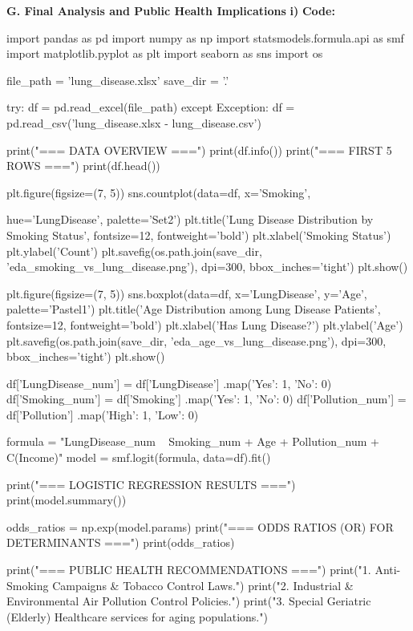 \documentclass[12pt,a4paper]{article}
\begin{document}
\textbf{G. Final Analysis and Public Health Implications}
\textbf{i)}
\textbf{Code:}
\begin{codebox}
import pandas as pd
import numpy as np
import statsmodels.formula.api as smf
import matplotlib.pyplot as plt
import seaborn as sns
import os

file_path = 'lung_disease.xlsx'
save_dir = '.'

try:
    df = pd.read_excel(file_path)
except Exception:
    df = pd.read_csv('lung_disease.xlsx - lung_disease.csv')

print("=== DATA OVERVIEW ===")
print(df.info())
print("\n=== FIRST 5 ROWS ===")
print(df.head())

plt.figure(figsize=(7, 5))
sns.countplot(data=df, x='Smoking', 

hue='LungDisease', palette='Set2')
plt.title('Lung Disease Distribution by
Smoking Status', fontsize=12, fontweight='bold')
plt.xlabel('Smoking Status')
plt.ylabel('Count')
plt.savefig(os.path.join(save_dir, 
'eda_smoking_vs_lung_disease.png'), dpi=300, bbox_inches='tight')
plt.show()

plt.figure(figsize=(7, 5))
sns.boxplot(data=df, x='LungDisease',
y='Age', palette='Pastel1')
plt.title('Age Distribution among Lung Disease Patients',
fontsize=12, fontweight='bold')
plt.xlabel('Has Lung Disease?')
plt.ylabel('Age')
plt.savefig(os.path.join(save_dir,
'eda_age_vs_lung_disease.png'),
dpi=300, bbox_inches='tight')
plt.show()

df['LungDisease_num'] = df['LungDisease']
.map({'Yes': 1, 'No': 0})
df['Smoking_num'] = df['Smoking']
.map({'Yes': 1, 'No': 0})
df['Pollution_num'] = df['Pollution']
.map({'High': 1, 'Low': 0})

formula = "LungDisease_num ~
Smoking_num + Age + Pollution_num + C(Income)"
model = smf.logit(formula, data=df).fit()

print("=== LOGISTIC REGRESSION RESULTS ===")
print(model.summary())

odds_ratios = np.exp(model.params)
print("=== ODDS RATIOS (OR) FOR DETERMINANTS ===")
print(odds_ratios)

print("=== PUBLIC HEALTH RECOMMENDATIONS ===")
print("1. Anti-Smoking Campaigns & Tobacco Control Laws.")
print("2. Industrial & Environmental
Air Pollution Control Policies.")
print("3. Special Geriatric (Elderly) 
Healthcare services for aging populations.")
\end{codebox}
\end{document}
